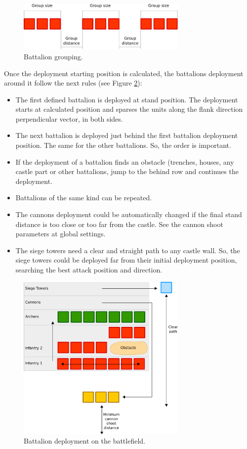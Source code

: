 \documentclass[tog]{acmsiggraph}
\begin{document}
 
\begin{figure}[h]
  \centering
  \includegraphics[width=3.25in]{figs/battalion_groups}
  \caption{Battalion grouping. }
  \label{fig:battalion_groups}
\end{figure}
 
 

Once the deployment starting position is calculated, the battalions deployment around it follow the next rules (see Figure \ref{fig:battalion_deployment}):

\begin{itemize}
 \item The first defined battalion is deployed at stand position. The deployment starts at calculated position and sparses the units along the flank direction perpendicular vector, in both sides.
 \item The next battalion is deployed just behind the first battalion deployment position. The same for the other battalions. So, the order is important.
 \item If the deployment of a battalion finds an obstacle (trenches, houses, any castle part or other battalions, jump to the behind row and continues the deployment.
 \item Battalions of the same kind can be repeated.
 \item The cannons deployment could be automatically changed if the final stand distance is too close or too far from the castle. See the cannon shoot parameters at global settings.
 \item The siege towers need a clear and straight path to any castle wall. So, the siege towers could be deployed far from their initial deployment position, searching the best attack position and direction.
\end{itemize}

\begin{figure}[h]
  \centering
  \includegraphics[width=3.25in]{figs/battallion_deployment}
  \caption{Battalion deployment on the battlefield. }
  \label{fig:battalion_deployment}
\end{figure}
\end{document}

